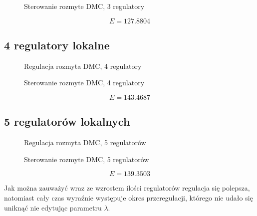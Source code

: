 \begin{figure}[H]
\centering

\caption{Sterowanie rozmyte DMC, 3 regulatory}
\end{figure}

\begin{equation}
    E = \num{127,8804}
\end{equation}

\subsection{4 regulatory lokalne}

\begin{figure}[H]
\centering

\caption{Regulacja rozmyta DMC, 4 regulatory}
\end{figure}

\begin{figure}[H]
\centering

\caption{Sterowanie rozmyte DMC, 4 regulatory}
\end{figure}

\begin{equation}
    E = \num{143,4687}
\end{equation}

\subsection{5 regulatorów lokalnych}

\begin{figure}[H]
\centering

\caption{Regulacja rozmyta DMC, 5 regulatorów}
\end{figure}

\begin{figure}[H]
\centering

\caption{Sterowanie rozmyte DMC, 5 regulatorów}
\end{figure}

\begin{equation}
    E = \num{139,3503}
\end{equation}

Jak można zauważyć wraz ze wzrostem ilości regulatorów regulacja się polepsza, natomiast cały czas wyraźnie występuje okres przeregulacji, którego nie udało się uniknąć nie edytując parametru $\lambda$.

